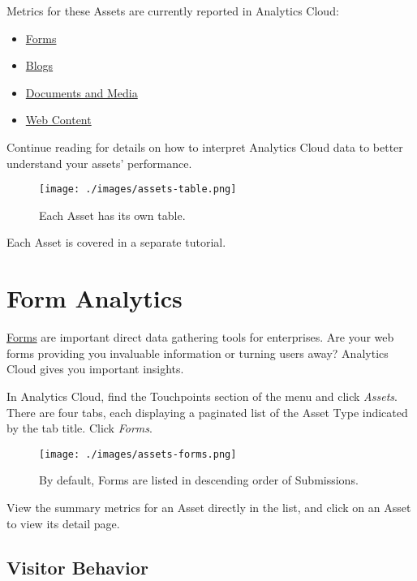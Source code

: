 Metrics for these Assets are currently reported in Analytics Cloud:

\begin{itemize}
\tightlist
\item
  \href{/docs/7-1/user/-/knowledge_base/u/forms}{Forms}
\item
  \href{/docs/7-1/user/-/knowledge_base/u/publishing-blogs}{Blogs}
\item
  \href{/docs/7-1/user/-/knowledge_base/u/managing-documents-and-media}{Documents
  and Media}
\item
  \href{/docs/7-1/user/-/knowledge_base/u/authoring-content-structured-and-inline-content}{Web
  Content}
\end{itemize}

Continue reading for details on how to interpret Analytics Cloud data to
better understand your assets' performance.

\begin{figure}
\centering
\texttt{[image: ./images/assets-table.png]}
\caption{Each Asset has its own table.}
\end{figure}

Each Asset is covered in a separate tutorial.

\section{Form Analytics}\label{form-analytics}

\href{/docs/7-1/user/-/knowledge_base/u/forms}{Forms} are important
direct data gathering tools for enterprises. Are your web forms
providing you invaluable information or turning users away? Analytics
Cloud gives you important insights.

In Analytics Cloud, find the Touchpoints section of the menu and click
\emph{Assets}. There are four tabs, each displaying a paginated list of
the Asset Type indicated by the tab title. Click \emph{Forms}.

\begin{figure}
\centering
\texttt{[image: ./images/assets-forms.png]}
\caption{By default, Forms are listed in descending order of
Submissions.}
\end{figure}

View the summary metrics for an Asset directly in the list, and click on
an Asset to view its detail page.

\subsection{Visitor Behavior}\label{visitor-behavior-1}

